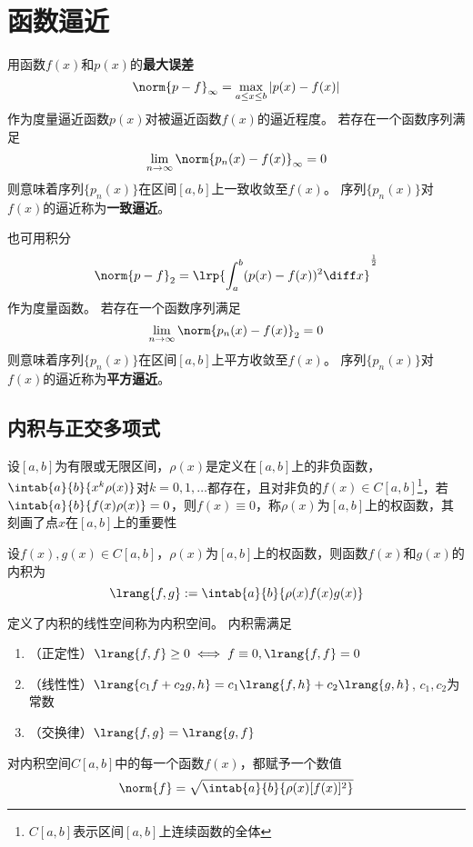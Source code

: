 
\section{函数逼近} %
用函数$f(x)$和$p(x)$的\textbf{最大误差}
\[\norm{p-f}_\infty=\max_{a\leq x\leq b}|p(x)-f(x)|\]
作为度量逼近函数$p(x)$对被逼近函数$f(x)$的逼近程度。
若存在一个函数序列满足
\[\lim_{n\to\infty}\norm{p_n(x)-f(x)}_\infty=0\]
则意味着序列$\{p_n(x)\}$在区间$[a,b]$上一致收敛至$f(x)$。
序列$\{p_n(x)\}$对$f(x)$的逼近称为\textbf{一致逼近}。

也可用积分
\[\norm{p-f}_2=\lrp{\int_a^b(p(x)-f(x))^2\diff x}^{\frac{1}{2}}\]
作为度量函数。
若存在一个函数序列满足
\[\lim_{n\to\infty}\norm{p_n(x)-f(x)}_2=0\]
则意味着序列$\{p_n(x)\}$在区间$[a,b]$上平方收敛至$f(x)$。
序列$\{p_n(x)\}$对$f(x)$的逼近称为\textbf{平方逼近}。

\subsection{内积与正交多项式}
\begin{definition}[权函数]
    设$[a,b]$为有限或无限区间，$\rho(x)$是定义在$[a,b]$上的非负函数，$\intab{a}{b}{x^k\rho(x)}$对$k=0,1,\ldots$都存在，且对非负的$f(x)\in C[a,b]$\footnote{$C[a,b]$表示区间$[a,b]$上连续函数的全体}，若$\intab{a}{b}{f(x)\rho(x)}=0$，则$f(x)\equiv 0$，称$\rho(x)$为$[a,b]$上的权函数，其刻画了点$x$在$[a,b]$上的重要性
\end{definition}
\begin{definition}[内积]
    设$f(x),g(x)\in C[a,b]$，$\rho(x)$为$[a,b]$上的权函数，则函数$f(x)$和$g(x)$的内积为
    \[\lrang{f,g}:=\intab{a}{b}{\rho(x)f(x)g(x)}\]
\end{definition}
定义了内积的线性空间称为内积空间。
内积需满足
\begin{enumerate}
    \item （正定性）$\lrang{f,f}\geq 0\iff f\equiv 0,\lrang{f,f}=0$
    \item （线性性）$\lrang{c_1f+c_2g,h}=c_1\lrang{f,h}+c_2\lrang{g,h}$, $c_1,c_2$为常数
    \item （交换律）$\lrang{f,g}=\lrang{g,f}$
\end{enumerate}

\begin{definition}[范数]
对内积空间$C[a,b]$中的每一个函数$f(x)$，都赋予一个数值
\[\norm{f}=\sqrt{\intab{a}{b}{\rho(x)[f(x)]^2}}\]
\end{definition}

